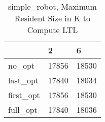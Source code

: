 \begin{table}
\caption{simple\_robot, Maximum Resident Size in K to Compute LTL}
\label{simple_robot_LTL_size}
\begin{tabular}{lll}
\toprule
 & 2 & 6 \\
\midrule
no\_opt & 17856 & 18530 \\
last\_opt & 17840 & 18034 \\
first\_opt & 17856 & 18530 \\
full\_opt & 17840 & 18036 \\
\bottomrule
\end{tabular}
\end{table}
